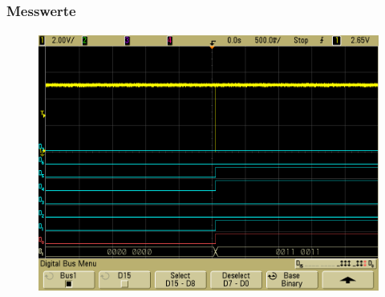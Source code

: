 \begin{frame}
    \frametitle{Messwerte}
    \framesubtitle{}
            \begin{figure}[H]
            \begin{center}
                    \includegraphics[scale=0.2]{./img/oszi/scope_10.png}
            \end{center}
            \end{figure}
            \begin{center}
            \end{center}
\end{frame}


